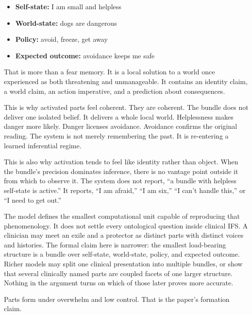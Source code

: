 \documentclass[11pt,a4paper]{article}
\makeatletter
\providecommand{\tightlist}{%
  \setlength{\itemsep}{0pt}\setlength{\parskip}{0pt}}
\renewcommand\section{\@startsection{section}{1}{0pt}{2.3ex plus 0.6ex minus 0.2ex}{1.1ex plus 0.2ex}{\large\bfseries}}
\makeatother
\begin{document}
\begin{itemize}
\tightlist
\item
  \textbf{Self-state:} I am small and helpless
\item
  \textbf{World-state:} dogs are dangerous
\item
  \textbf{Policy:} avoid, freeze, get away
\item
  \textbf{Expected outcome:} avoidance keeps me safe
\end{itemize}

That is more than a fear memory. It is a local solution to a world once
experienced as both threatening and unmanageable. It contains an
identity claim, a world claim, an action imperative, and a prediction
about consequences.

This is why activated parts feel coherent. They are coherent. The bundle
does not deliver one isolated belief. It delivers a whole local world.
Helplessness makes danger more likely. Danger licenses avoidance.
Avoidance confirms the original reading. The system is not merely
remembering the past. It is re-entering a learned inferential regime.

This is also why activation tends to feel like identity rather than
object. When the bundle's precision dominates inference, there is no
vantage point outside it from which to observe it. The system does not
report, ``a bundle with helpless self-state is active.'' It reports, ``I
am afraid,'' ``I am six,'' ``I can't handle this,'' or ``I need to get
out.''

The model defines the smallest computational unit capable of reproducing
that phenomenology. It does not settle every ontological question inside
clinical IFS. A clinician may meet an exile and a protector as distinct
parts with distinct voices and histories. The formal claim here is
narrower: the smallest load-bearing structure is a bundle over
self-state, world-state, policy, and expected outcome. Richer models may
split one clinical presentation into multiple bundles, or show that
several clinically named parts are coupled facets of one larger
structure. Nothing in the argument turns on which of those later proves
more accurate.

\section{How Parts Form}\label{how-parts-form}

Parts form under overwhelm and low control. That is the paper's
formation claim.
\end{document}
